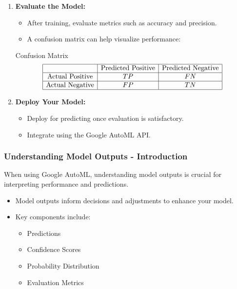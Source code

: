 \documentclass[aspectratio=169]{beamer}
\begin{document}
\begin{frame}[fragile]
\begin{enumerate}
        \item \textbf{Evaluate the Model:} 
        \begin{itemize}
            \item After training, evaluate metrics such as accuracy and precision.
            \item A confusion matrix can help visualize performance:
            \end{itemize}
            \begin{block}{Confusion Matrix}
                \begin{equation}
                \begin{array}{|c|c|c|}
                    \hline
                    & \text{Predicted Positive} & \text{Predicted Negative} \\
                    \hline
                    \text{Actual Positive} & TP & FN \\
                    \hline
                    \text{Actual Negative} & FP & TN \\
                    \hline
                \end{array}
                \end{equation}
            \end{block}
        
        \item \textbf{Deploy Your Model:}
        \begin{itemize}
            \item Deploy for predicting once evaluation is satisfactory.
            \item Integrate using the Google AutoML API.
        \end{itemize}
    \end{enumerate}
\end{frame}

\begin{frame}[fragile]
    \frametitle{Understanding Model Outputs - Introduction}
    When using Google AutoML, understanding model outputs is crucial for interpreting performance and predictions.
    \begin{itemize}
        \item Model outputs inform decisions and adjustments to enhance your model.
        \item Key components include:
        \begin{itemize}
            \item Predictions
            \item Confidence Scores
            \item Probability Distribution
            \item Evaluation Metrics
        \end{itemize}
    \end{itemize}
\end{frame}
\end{document}
